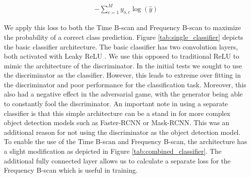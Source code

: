 \begin{center}
    \begin{align}
    \label{eq:cross-entropy}
        -\sum_{c=1}^My_{o,c}\log({\hat{y}})
    \end{align}
\end{center}

\hspace{0.5in}We apply this loss to both the Time B-scan and Frequency B-scan to maximize the probability of a correct class prediction. Figure \ref{tab:single_classifier} depicts the basic classifier architecture. The basic classifier has two convolution layers, both activated with Leaky ReLU \cite{leaky_relu}. We use this opposed to traditional ReLU to mimic the architecture of the discriminator. In the initial tests we sought to use the discriminator as the classifier. However, this leads to extreme over fitting in the discriminator and poor performance for the classification task. Moreover, this also had a negative effect in the adversarial game, with the generator being able to constantly fool the discriminator. An important note in using a separate classifier is that this simple architecture can be a stand in for more complex object detection models such as Faster-RCNN\cite{Faster-RCNN} or Mask-RCNN\cite{Mask-RCNN}. This was an additional reason for not using the discriminator as the object detection model. To enable the use of the Time B-scan and Frequency B-scan, the architecture has a slight modification as depicted in Figure \ref{tab:combined_classifier}. The additional fully connected layer allows us to calculate a separate loss for the Frequency B-scan which is useful in training. 


